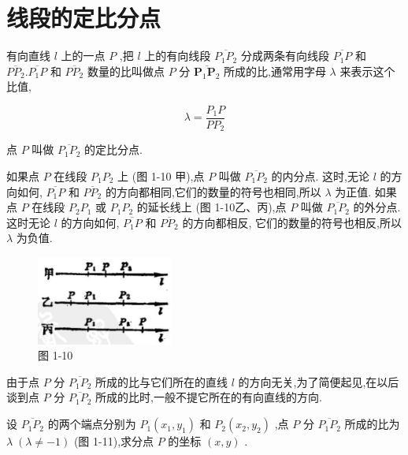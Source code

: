 \documentclass[lang=cn,newtx,10pt,scheme=chinese]{elegantbook}
\begin{document}
\section{线段的定比分点}

有向直线 \(l\) 上的一点 \(P\) ,把 \(l\) 上的有向线段 \(\overline{{P}_{1}{P}_{2}}\) 分成两条有向线段 \(\overline{{P}_{1}P}\) 和 \(\overline{P{P}_{2}}.\overline{{P}_{1}P}\) 和 \(\overline{P{P}_{2}}\) 数量的比叫做点 \(P\) 分 \(\overline{{\mathbf{P}}_{1}{\mathbf{P}}_{2}}\) 所成的比,通常用字母 \(\lambda\) 来表示这个比值,

\[
  \lambda = \frac{{P}_{1}P}{P{P}_{2}}
\]

点 \(P\) 叫做 \(\overline{{P}_{1}{P}_{2}}\) 的定比分点.

如果点 \(P\) 在线段 \({P}_{1}{P}_{2}\) 上 (图 1-10 甲),点 \(P\) 叫做 \(\overline{{P}_{1}{P}_{2}}\) 的内分点. 这时,无论 \(l\) 的方向如何, \(\overline{{P}_{1}P}\) 和 \(\overline{P{P}_{2}}\) 的方向都相同,它们的数量的符号也相同,所以 \(\lambda\) 为正值. 如果点 \(P\) 在线段 \({P}_{2}{P}_{1}\) 或 \({P}_{1}{P}_{2}\) 的延长线上 (图 1-10乙、丙),点 \(P\) 叫做 \(\overline{{P}_{1}{P}_{2}}\) 的外分点. 这时无论 \(l\) 的方向如何, \(\overline{{P}_{1}P}\) 和 \(\overline{P{P}_{2}}\) 的方向都相反, 它们的数量的符号也相反,所以 \(\lambda\) 为负值.

\begin{figure}[h]
  \centering
  \includegraphics[max width=0.4\textwidth]{images/01912cc2-ffb6-728e-9ae7-b113ff05c64b_12_791347.jpg}
  \caption{图 1-10}
\end{figure}



由于点 \(P\) 分 \(\overline{{P}_{1}{P}_{2}}\) 所成的比与它们所在的直线 \(l\) 的方向无关,为了简便起见,在以后谈到点 \(P\) 分 \(\overline{{P}_{1}{P}_{2}}\) 所成的比时,一般不提它所在的有向直线的方向.

设 \(\overline{{P}_{1}{P}_{2}}\) 的两个端点分别为 \({P}_{1}\left( {{x}_{1},{y}_{1}}\right)\) 和 \({P}_{2}\left( {{x}_{2},{y}_{2}}\right)\) ,点 \(P\) 分 \(\overline{{P}_{1}{P}_{2}}\) 所成的比为 \(\lambda \;\left( {\lambda \neq - 1}\right)\) (图 1-11),求分点 \(P\) 的坐标 \(\left( {x,y}\right)\) .
\end{document}
